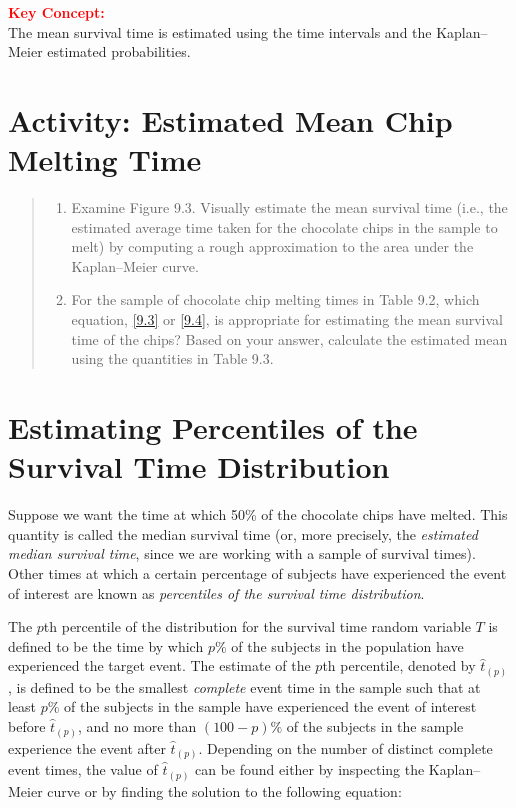 \documentclass[
]{report}
\providecommand{\tightlist}{%
  \setlength{\itemsep}{0pt}\setlength{\parskip}{0pt}}
\begin{document}
\textbf{\textcolor{red}{Key Concept:}}\\
\color{red}
The mean survival time is estimated using the time intervals and the Kaplan--Meier estimated probabilities.\\
\color{black}
\normalsize

\section*{Activity: Estimated Mean Chip Melting Time}\label{activity-estimated-mean-chip-melting-time}

\begin{quote}
\begin{enumerate}
\def\labelenumi{\arabic{enumi}.}
\setcounter{enumi}{20}
\tightlist
\item
  Examine Figure 9.3. Visually estimate the mean survival time (i.e., the estimated average time taken for the chocolate chips in the sample to melt) by computing a rough approximation to the area under the Kaplan--Meier curve.\\
\item
  For the sample of chocolate chip melting times in Table 9.2, which equation, \ref{9.3} or \ref{9.4}, is appropriate for estimating the mean survival time of the chips? Based on your answer, calculate the estimated mean using the quantities in Table 9.3.
\end{enumerate}
\end{quote}

\section*{Estimating Percentiles of the Survival Time Distribution}\label{estimating-percentiles-of-the-survival-time-distribution}

Suppose we want the time at which 50\% of the chocolate chips have melted. This quantity is called the median survival time (or, more precisely, the \emph{estimated median survival time}, since we are working with a sample of survival times). Other times at which a certain percentage of subjects have experienced the event of interest are known as \emph{percentiles of the survival time distribution}.

The \(p\)th percentile of the distribution for the survival time random variable \(T\) is defined to be the time by which \(p\%\) of the subjects in the population have experienced the target event. The estimate of the \(p\)th percentile, denoted by \(\hat t_{(p)}\), is defined to be the smallest \emph{complete} event time in the sample such that at least \(p\%\) of the subjects in the sample have experienced the event of interest before \(\hat t_{(p)}\), and no more than \((100 - p)\%\) of the subjects in the sample experience the event after \(\hat t_{(p)}\). Depending on the number of distinct complete event times, the value of \(\hat t_{(p)}\) can be found either by inspecting the Kaplan--Meier curve or by finding the solution to the following equation:
\end{document}
